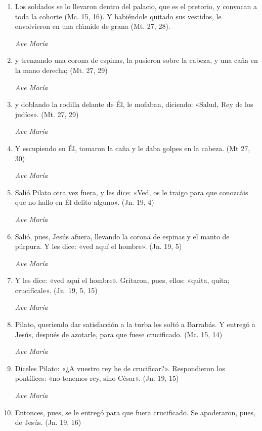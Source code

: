 \documentclass[a4paper,11pt, oneside]{report}
\begin{document}
        \begin{enumerate}

          \item Los soldados se lo llevaron dentro del palacio, que es el pretorio, y convocan a toda la cohorte (Mc. 15, 16).
          Y habiéndole quitado sus vestidos, le envolvieron en una clámide de grana (Mt. 27, 28).

          \textit{Ave María}

          \item y trenzando una corona de espinas, la pusieron sobre la cabeza, y una caña en la mano derecha; (Mt. 27, 29)

          \textit{Ave María}

          \item y doblando la rodilla delante de Él, le mofaban, diciendo: «Salud, Rey de los judíos». (Mt. 27, 29)

          \textit{Ave María}

          \item Y escupiendo en Él, tomaron la caña y le daba golpes en la cabeza. (Mt 27, 30)

          \textit{Ave María}

          \item Salió Pilato otra vez fuera, y les dice: «Ved, os le traigo para que conozcáis que no hallo en Él delito alguno». (Jn. 19, 4)

          \textit{Ave María}

          \item Salió, pues, Jesús afuera, llevando la corona de espinas y el manto de púrpura. Y les dice: «ved aquí el hombre». (Jn. 19, 5)

          \textit{Ave María}

          \item Y les dice: «ved aquí el hombre». Gritaron, pues, ellos: «quita, quita; crucifícale». (Jn. 19, 5, 15)

          \textit{Ave María}

          \item Pilato, queriendo dar satisfacción a la turba les soltó a Barrabás. Y entregó a Jesús, después de azotarle, para que fuese crucificado. (Mc. 15, 14)

          \textit{Ave María}

          \item Díceles Pilato: «¿A vuestro rey he de crucificar?». Respondieron los pontífices: «no tenemos rey, sino César». (Jn. 19, 15)

          \textit{Ave María}

          \item Entonces, pues, se le entregó para que fuera crucificado. Se apoderaron, pues, de Jesús. (Jn. 19, 16)

        \end{enumerate}
\end{document}
